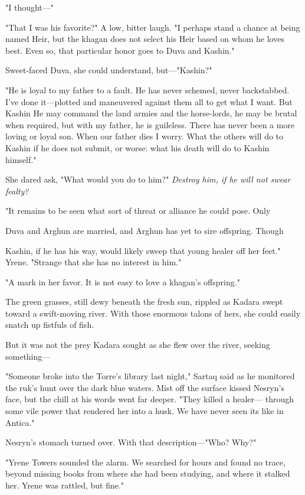 "I thought---"

"That I was his favorite?" A low, bitter laugh. "I perhaps stand a chance at being named Heir, but the khagan does not select his Heir based on whom he loves best. Even so, that particular honor goes to Duva and Kashin."

Sweet-faced Duva, she could understand, but---"Kashin?"

"He is loyal to my father to a fault. He has never schemed, never backstabbed. I've done it---plotted and maneuvered against them all to get what I want. But Kashin  He may command the land armies and the horse-lords, he may be brutal when required, but with my father, he is guileless. There has never been a more loving or loyal son. When our father dies  I worry. What the others will do to Kashin if he does not submit, or worse: what his death will do to Kashin himself."

She dared ask, "What would you do to him?" \emph{Destroy him, if he will not swear fealty?}

"It remains to be seen what sort of threat or alliance he could pose. Only

Duva and Arghun are married, and Arghun has yet to sire offspring. Though

Kashin, if he has his way, would likely sweep that young healer off her feet." Yrene. "Strange that she has no interest in him."

"A mark in her favor. It is not easy to love a khagan's offspring."

The green grasses, still dewy beneath the fresh sun, rippled as Kadara swept toward a swift-moving river. With those enormous talons of hers, she could easily snatch up fistfuls of fish.

But it was not the prey Kadara sought as she flew over the river, seeking something---

"Someone broke into the Torre's library last night," Sartaq said as he monitored the ruk's hunt over the dark blue waters. Mist off the surface kissed Nesryn's face, but the chill at his words went far deeper. "They killed a healer--- through some vile power that rendered her into a husk. We have never seen its like in Antica."

Nesryn's stomach turned over. With that description---"Who? Why?"

"Yrene Towers sounded the alarm. We searched for hours and found no trace, beyond missing books from where she had been studying, and where it stalked her. Yrene was rattled, but fine."

